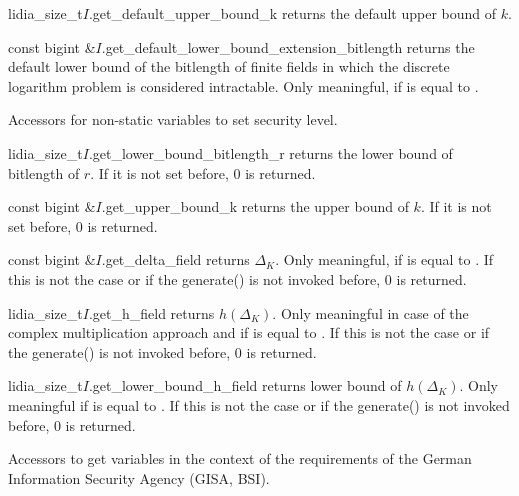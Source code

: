 \begin{cfcode}{lidia_size_t}{$I$.get_default_upper_bound_k}{}
  returns the default upper bound of $k.$
\end{cfcode}

\begin{cfcode}{const bigint &}{$I$.get_default_lower_bound_extension_bitlength}
{}
  returns the default lower bound of the bitlength of finite fields
  in which the discrete logarithm problem is considered
  intractable. Only meaningful, if  is equal to
  .
\end{cfcode}

Accessors for non-static variables to set security level.

\begin{cfcode}{lidia_size_t}{$I$.get_lower_bound_bitlength_r}{}
  returns the lower bound of bitlength of $r.$ If it is not set before,
  0 is returned.
\end{cfcode}

\begin{cfcode}{const bigint &}{$I$.get_upper_bound_k}{}
  returns the upper bound of $k.$ If it is not set before,
  0 is returned.
\end{cfcode}

\begin{cfcode}{const bigint &}{$I$.get_delta_field}{}
  returns $\Delta_K.$ Only meaningful, if 
  is equal to .
  If this is not the case or if the generate() is not
  invoked before, 0 is returned.
\end{cfcode}

\begin{cfcode}{lidia_size_t}{$I$.get_h_field}{}
  returns $h(\Delta_K).$ Only meaningful in case
  of the complex multiplication approach and if 
  is equal to .
  If this is not the case or if the generate() is not
  invoked before, 0 is returned.
\end{cfcode}

\begin{cfcode}{lidia_size_t}{$I$.get_lower_bound_h_field}{}
  returns lower bound of $h(\Delta_K).$ Only meaningful 
  if  is equal to .
  If this is not the case or if the generate() is not
  invoked before, 0 is returned.
\end{cfcode}

Accessors to get variables in the context of
the requirements of the German Information Security
Agency (GISA, BSI).

